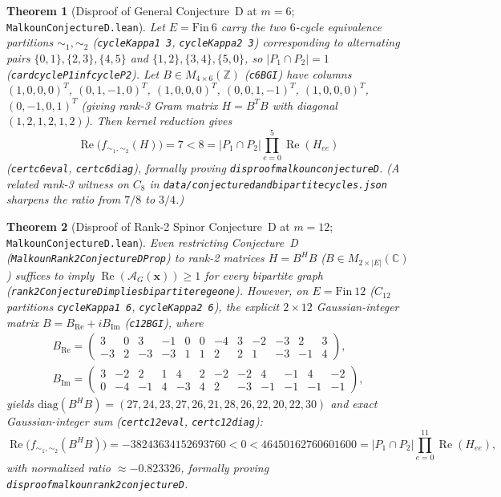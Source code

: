 \documentclass[11pt]{amsart}
\renewcommand{\_}{\origunderscore\penalty0\relax}
\theoremstyle{plain}
\newtheorem{theorem}{Theorem}[section]
\theoremstyle{definition}
\theoremstyle{remark}
\newcommand{\C}{\mathbb{C}}
\newcommand{\Z}{\mathbb{Z}}
\newcommand{\AG}{\mathcal{A}_G}
\DeclareMathOperator{\RePart}{Re}
\begin{document}
\begin{theorem}[Disproof of General Conjecture~D at $m = 6$; \texttt{MalkounConjectureD.lean}]\label{thm:conjD_gen}
Let $E = \mathrm{Fin}\ 6$ carry the two $6$-cycle equivalence partitions $\sim_1, \sim_2$ (\texttt{cycleKappa1 3}, \texttt{cycleKappa2 3}) corresponding to alternating pairs $\{0,1\},\{2,3\},\{4,5\}$ and $\{1,2\},\{3,4\},\{5,0\}$, so $|P_1 \cap P_2| = 1$ (\texttt{card\_cycleP1\_inf\_cycleP2}). Let $B \in M_{4 \times 6}(\Z)$ (\texttt{c6BGI}) have columns $(1,0,0,0)^T$, $(0,1,-1,0)^T$, $(1,0,0,0)^T$, $(0,0,1,-1)^T$, $(1,0,0,0)^T$, $(0,-1,0,1)^T$ (giving rank-3 Gram matrix $H = B^T B$ with diagonal $(1,2,1,2,1,2)$). Then kernel reduction gives
\[
    \RePart\bigl(f_{\sim_1,\sim_2}(H)\bigr) = 7 < 8 = |P_1 \cap P_2| \prod_{e=0}^5 \RePart(H_{ee})
\]
(\texttt{cert\_c6\_eval}, \texttt{cert\_c6\_diag}), formally proving \texttt{disproof\_malkoun\_conjecture\_D}. (A related rank-3 witness on $C_8$ in \texttt{data/conjecture\_d\_and\_bipartite\_cycles.json} sharpens the ratio from $7/8$ to $3/4$.)
\end{theorem}

\begin{theorem}[Disproof of Rank-2 Spinor Conjecture~D at $m = 12$; \texttt{MalkounConjectureD.lean}]\label{thm:conjD_rank2}
Even restricting Conjecture~D (\texttt{MalkounRank2ConjectureDProp}) to rank-2 matrices $H = B^H B$ ($B \in M_{2 \times |E|}(\C)$) suffices to imply $\RePart(\AG(\mathbf{x})) \ge 1$ for every bipartite graph (\texttt{rank2ConjectureD\_implies\_bipartite\_re\_ge\_one}). However, on $E = \mathrm{Fin}\ 12$ ($C_{12}$ partitions \texttt{cycleKappa1 6}, \texttt{cycleKappa2 6}), the explicit $2 \times 12$ Gaussian-integer matrix $B = B_{\mathrm{Re}} + i B_{\mathrm{Im}}$ (\texttt{c12BGI}), where
{\small
\begin{gather*}
    B_{\mathrm{Re}} = \begin{pmatrix}
        3 & 0 & 3 & -1 & 0 & 0 & -4 & 3 & -2 & -3 & 2 & 3 \\
        -3 & 2 & -3 & -3 & 1 & 1 & 2 & 2 & 1 & -3 & -1 & 4
    \end{pmatrix}, \\
    B_{\mathrm{Im}} = \begin{pmatrix}
        3 & -2 & 2 & 1 & 4 & 2 & -2 & -2 & 4 & -1 & 4 & -2 \\
        0 & -4 & -1 & 4 & -3 & 4 & 2 & -3 & -1 & -1 & -1 & -1
    \end{pmatrix},
\end{gather*}
}
yields $\mathrm{diag}(B^H B) = (27,24,23,27,26,21,28,26,22,20,22,30)$ and exact Gaussian-integer sum (\texttt{cert\_c12\_eval}, \texttt{cert\_c12\_diag}):
\[
    \RePart\bigl(f_{\sim_1,\sim_2}(B^H B)\bigr) = -38243634152693760 < 0 < 46450162760601600 = |P_1 \cap P_2|\prod_{e=0}^{11} \RePart(H_{ee}),
\]
with normalized ratio $\approx -0.823326$, formally proving \texttt{disproof\_malkoun\_rank2\_conjecture\_D}.
\end{theorem}
\end{document}
